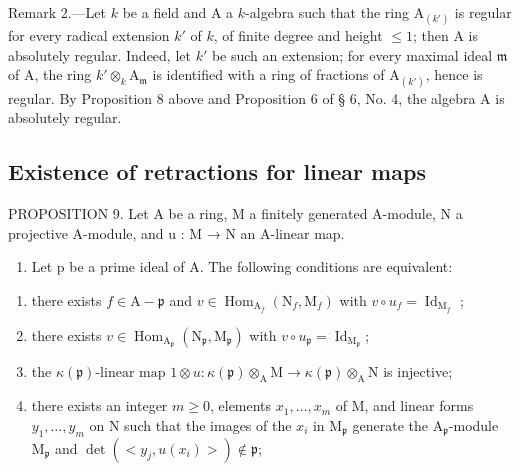 Remark 2.—Let \(k\) be a field and A a \(k\)-algebra such that the ring \(\mathrm{A}_{(k')}\) is regular for every radical extension \(k'\) of \(k\), of finite degree and height \(\leqslant 1\); then A is absolutely regular. Indeed, let \(k'\) be such an extension; for every maximal ideal \(\mathfrak{m}\) of A, the ring \(k'\otimes_k\mathrm{A}_{\mathfrak{m}}\) is identified with a ring of fractions of \(\mathrm{A}_{(k')}\), hence is regular. By Proposition 8 above and Proposition 6 of § 6, No. 4, the algebra A is absolutely regular.

\subsection{Existence of retractions for linear maps}

PROPOSITION 9. Let A be a ring, M a finitely generated A-module, N a projective A-module, and u : M → N an A-linear map.

\begin{enumerate}
\def\labelenumi{\alph{enumi})}
\tightlist
\item
  Let p be a prime ideal of A. The following conditions are equivalent:
\end{enumerate}

\begin{enumerate}
\def\labelenumi{(\roman{enumi})}
\item
  there exists \(f \in \mathrm{A} - \mathfrak{p}\) and \(v \in \operatorname{Hom}_{\mathrm{A}_f}(\mathrm{N}_f, \mathrm{M}_f)\) with \(v \circ u_f = \operatorname{Id}_{\mathrm{M}_f}\) ;
\item
  there exists \(v \in \operatorname{Hom}_{\mathrm{A}_{\mathfrak{p}}}(\mathrm{N}_{\mathfrak{p}}, \mathrm{M}_{\mathfrak{p}})\) with \(v \circ u_{\mathfrak{p}} = \operatorname{Id}_{\mathrm{M}_{\mathfrak{p}}}\);
\item
  the \(\kappa(\mathfrak{p})\text{-linear map }1 \otimes u : \kappa(\mathfrak{p}) \otimes_{\mathrm{A}} \mathrm{M} \to \kappa(\mathfrak{p}) \otimes_{\mathrm{A}} \mathrm{N}\) is injective;
\item
  there exists an integer \(m \geqslant 0\), elements \(x_{1}, \ldots, x_{m}\) of M, and linear forms \(y_{1}, \ldots, y_{m}\) on N such that the images of the \(x_{i}\) in \(\mathrm{M}_{\mathfrak{p}}\) generate the \(\mathrm{A}_{\mathfrak{p}}\)-module \(\mathrm{M}_{\mathfrak{p}}\) and \(\det(<y_{j}, u(x_{i})>) \notin \mathfrak{p}\);
\end{enumerate}

